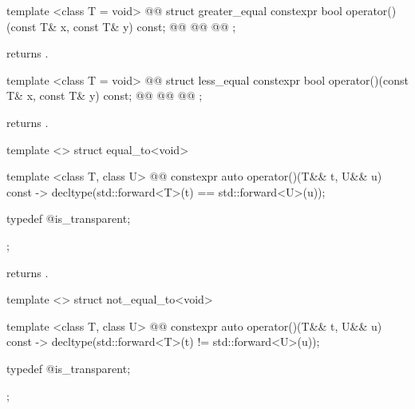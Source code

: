 %
\begin{itemdecl}
template <class T = void>
  @@
struct greater_equal {
  constexpr bool operator()(const T& x, const T& y) const;
  @@
  @@
  @@
};
\end{itemdecl}

\begin{itemdescr}
\pnum
{} returns .
\end{itemdescr}

%
\begin{itemdecl}
template <class T = void>
  @@
struct less_equal {
  constexpr bool operator()(const T& x, const T& y) const;
  @@
  @@
  @@
};
\end{itemdecl}

\begin{itemdescr}
\pnum
{} returns .
\end{itemdescr}

%
\begin{itemdecl}
template <> struct equal_to<void> {
  template <class T, class U>
    @@
  constexpr auto operator()(T&& t, U&& u) const
    -> decltype(std::forward<T>(t) == std::forward<U>(u));

  typedef @\unspec@ is_transparent;
};
\end{itemdecl}

\begin{itemdescr}
\pnum
{} returns .
\end{itemdescr}

%
\begin{itemdecl}
template <> struct not_equal_to<void> {
  template <class T, class U>
    @@
  constexpr auto operator()(T&& t, U&& u) const
    -> decltype(std::forward<T>(t) != std::forward<U>(u));

  typedef @\unspec@ is_transparent;
};
\end{itemdecl}

